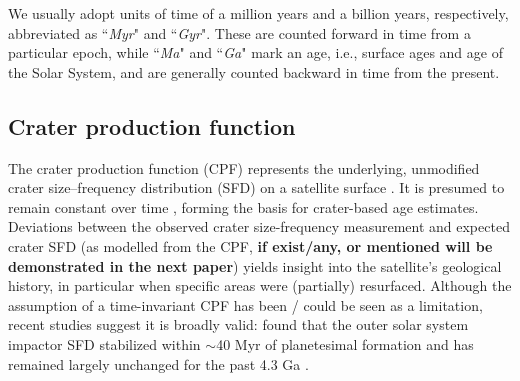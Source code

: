 \documentclass[preprint,12pt,3p,times,authoryear]{elsarticle}
\begin{document}
We usually adopt units of time of a million years and a billion years, respectively, abbreviated as ``{\it Myr}" and ``{\it Gyr}". These are counted forward in time from a particular epoch, while ``{\it Ma}" and ``{\it Ga}" mark an age, i.e., surface ages and age of the Solar System, and are generally counted backward in time from the present.

\subsection{Crater production function}
\label{sub:intro_cpf}

The crater production function (CPF) represents the underlying, unmodified crater size–frequency distribution (SFD) on a satellite surface \citep{Neukum1975}. It is presumed to remain constant over time \citep{Neukum1975,Neukum1983,Werner2014,Werner2023}, forming the basis for crater-based age estimates. Deviations between the observed crater size-frequency measurement and expected crater SFD (as modelled from the CPF, \textbf{if exist/any, or mentioned will be demonstrated in the next paper}) yields insight into the satellite's geological history, in particular when specific areas were (partially) resurfaced. Although the assumption of a time-invariant CPF has been / could be seen as a limitation, recent studies suggest it is broadly valid: \citet{Bottke2024} found that the outer solar system impactor SFD stabilized within $\sim$40 Myr of planetesimal formation and has remained largely unchanged for the past 4.3 Ga \citep{Bottke2024}.
\end{document}
